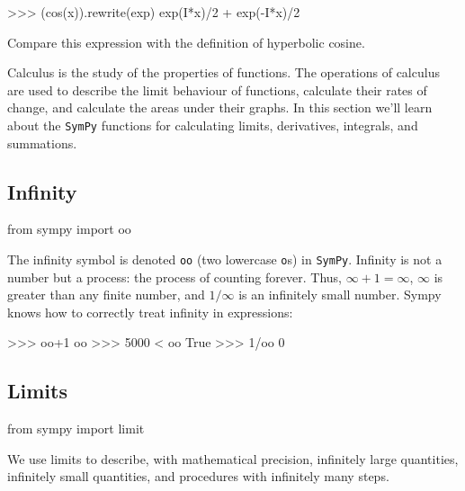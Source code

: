 \small
\begin{verbatimtab}
>>> (cos(x)).rewrite(exp)
exp(I*x)/2 + exp(-I*x)/2
\end{verbatimtab} 
\normalsize

\noindent
Compare this expression with the definition of hyperbolic cosine. 

\label{sec:sympytut_calculus}

Calculus is the study of the properties of functions.
The operations of calculus are used to describe the limit behaviour of functions,
calculate their rates of change,
and calculate the areas under their graphs.
In this section we'll learn about the \texttt{SymPy} functions for calculating
limits, derivatives, integrals, and summations.

\subsection{Infinity}
\label{calculus:infinity}

\small
\begin{verbatimtab}
from sympy import oo
\end{verbatimtab}
\normalsize

\noindent
The infinity symbol is denoted \texttt{oo} (two lowercase \texttt{o}s) in \texttt{SymPy}.
Infinity is not a number but a process: the process of counting forever.
Thus, $\infty + 1 = \infty$, 
$\infty$ is greater than any finite number,
and $1/\infty$ is an infinitely small number.
Sympy knows how to correctly treat infinity in expressions:

\small
\begin{verbatimtab}
>>> oo+1
oo
>>> 5000 < oo 
True
>>> 1/oo
0
\end{verbatimtab}
\normalsize

\subsection{Limits}
\label{calculus:limits}
\small
\begin{verbatimtab}
from sympy import limit
\end{verbatimtab}
\normalsize

\noindent
We use limits to describe, with mathematical precision, infinitely large quantities,
infinitely small quantities, and procedures with infinitely many steps.

